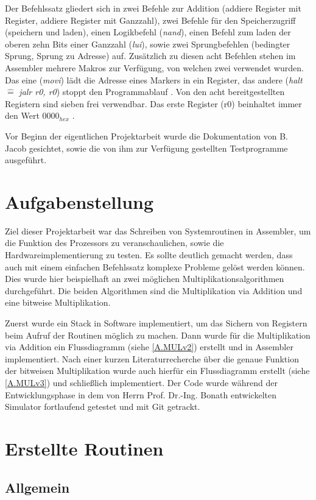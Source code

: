 \documentclass[fleqn, a4paper, 11pt]{article}       %
\begin{document}
Der Befehlssatz gliedert sich in zwei Befehle zur Addition (addiere Register mit Register, addiere Register mit Ganzzahl), zwei Befehle für den Speicherzugriff (speichern und laden), einen Logikbefehl (\emph{nand}), einen Befehl zum laden der oberen zehn Bits einer Ganzzahl (\emph{lui}), sowie zwei Sprungbefehlen (bedingter Sprung, Sprung zu Adresse) auf. Zusätzlich zu diesen acht Befehlen stehen im Assembler mehrere Makros zur Verfügung, von welchen zwei verwendet wurden. Das eine (\emph{movi}) lädt die Adresse eines Markers in ein Register, das andere (\emph{halt} $\widehat{=}$ \emph{jalr r0, r0}) stoppt den Programmablauf . Von den acht bereitgestellten Registern sind sieben frei verwendbar. Das erste Register (r0) beinhaltet immer den Wert $0000_{hex}$ \cite[1]{JACOBInstr}.

Vor Beginn der eigentlichen Projektarbeit wurde die Dokumentation von B. Jacob gesichtet, sowie die von ihm zur Verfügung gestellten Testprogramme ausgeführt.


\section{Aufgabenstellung}
Ziel dieser Projektarbeit war das Schreiben von Systemroutinen in Assembler, um die Funktion des Prozessors zu veranschaulichen, sowie die Hardwareimplementierung zu testen. Es sollte deutlich gemacht werden, dass auch mit einem einfachen Befehlssatz komplexe Probleme gelöst werden können. Dies wurde hier beispielhaft an zwei möglichen Multiplikationsalgorithmen durchgeführt. Die beiden Algorithmen sind die Multiplikation via Addition und eine bitweise Multiplikation. 

Zuerst wurde ein Stack in Software implementiert, um das Sichern von Registern beim Aufruf der Routinen möglich zu machen. Dann wurde für die Multiplikation via Addition ein Flussdiagramm (siehe \ref{A.MULv2}) erstellt und in Assembler implementiert. Nach einer kurzen Literaturrecherche über die genaue Funktion der bitweisen Multiplikation wurde auch hierfür ein Flussdiagramm erstellt (siehe \ref{A.MULv3}) und schließlich implementiert. Der Code wurde während der Entwicklungsphase in dem von Herrn Prof. Dr.-Ing. Bonath entwickelten Simulator fortlaufend getestet und mit Git getrackt.

\section{Erstellte Routinen}
\subsection{Allgemein}
\end{document}
